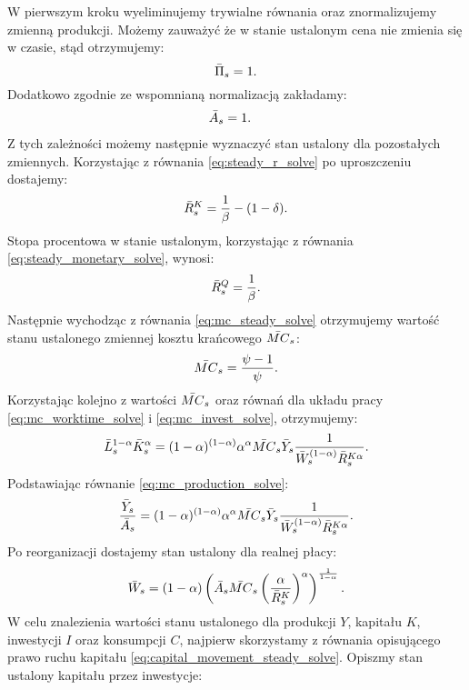W pierwszym kroku wyeliminujemy trywialne równania oraz znormalizujemy zmienną produkcji. Możemy zauważyć że w stanie ustalonym cena nie zmienia się w czasie, stąd otrzymujemy:
\begin{equation}
    \bar{\Pi}_s = 1.
\end{equation}
Dodatkowo zgodnie ze wspomnianą normalizacją zakładamy:
\begin{align}
    \bar{A}_s &= 1.
\end{align}
Z tych zależności możemy następnie wyznaczyć stan ustalony dla pozostałych zmiennych. Korzystając z równania \eqref{eq:steady_r_solve} po uproszczeniu dostajemy:
\begin{equation}
    \bar{R}_s^K = \frac{1}{\beta} - (1 - \delta).
\end{equation}
Stopa procentowa w stanie ustalonym, korzystając z równania \eqref{eq:steady_monetary_solve}, wynosi:
\begin{equation}
    \bar{R}_s^Q = \frac{1}{\beta}.
\end{equation}
Następnie wychodząc z równania \eqref{eq:mc_steady_solve} otrzymujemy wartość stanu ustalonego zmiennej kosztu krańcowego $\bar{MC}_s$:
\begin{equation}
    \bar{MC}_s = \frac{\psi - 1}{\psi}.
\end{equation}
Korzystając kolejno z wartości $\bar{MC}_s$ oraz równań dla układu pracy \eqref{eq:mc_worktime_solve} i \eqref{eq:mc_invest_solve}, otrzymujemy:
\begin{equation}
    \bar{L}_s^{1-\alpha}\bar{K}_s^\alpha = (1-\alpha)^{(1-\alpha)} \alpha^\alpha \bar{MC}_s \bar{Y}_s \frac{1}{\bar{W}_s^{(1-\alpha)} \bar{R}_s^{K\alpha}}.
\end{equation}
Podstawiając równanie \eqref{eq:mc_production_solve}:
\begin{equation}
    \frac{\bar{Y}_s}{\bar{A}_s} = (1-\alpha)^{(1-\alpha)} \alpha^\alpha \bar{MC}_s \bar{Y}_s \frac{1}{\bar{W}_s^{(1-\alpha)} \bar{R}_s^{K\alpha}}.
\end{equation}
Po reorganizacji dostajemy stan ustalony dla realnej płacy:
\begin{equation}
    \bar{W}_s = (1-\alpha)\left(\bar{A}_s \bar{MC}_s \left(\frac{\alpha}{\bar{R}_s^{K}}\right)^\alpha\right)^{\frac{1}{1-\alpha}}.
\end{equation}
W celu znalezienia wartości stanu ustalonego dla produkcji $Y$, kapitału $K$, inwestycji $I$ oraz konsumpcji $C$, najpierw skorzystamy z równania opisującego prawo ruchu kapitału \eqref{eq:capital_movement_steady_solve}. Opiszmy stan ustalony kapitału przez inwestycje:
